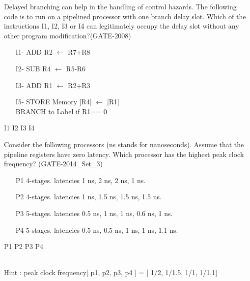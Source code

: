 \begin{questyle}
  \question  Delayed branching can help in the handling of control hazards. The following code is
             to run on a pipelined processor with one branch delay slot. Which of the instructions
             I1, I2, I3 or I4 can legitimately occupy the delay slot without any other program modification?(GATE-2008)

             \begin{enumerate}
                \item[I1-] ADD R2 \(\leftarrow\) R7+R8
                \item[I2-] SUB R4 \(\leftarrow\) R5-R6
                \item[I3-] ADD R1 \(\leftarrow\) R2+R3
                \item[I5-] STORE Memory [R4] \(\leftarrow\) [R1] \\
                 BRANCH to Label if R1== 0
            \end{enumerate}

  \begin{oneparchoices}
    \choice         I1
    \choice         I2
    \choice         I3
    \CorrectChoice  I4
  \end{oneparchoices}
\end{questyle}


\begin{questyle}
  \question  Consider the following processors (ns stands for nanoseconds). Assume that the pipeline registers
             have zero latency. Which processor has the highest peak clock frequency? (GATE-2014\_Set\_3)
    \begin{enumerate}
        \item[P1] 4-stages. latencies 1 ns, 2 ns, 2 ns, 1 ns.
        \item[P2] 4-stages. latencies 1 ns, 1.5 ns, 1.5 ns, 1.5 ns.
        \item[P3] 5-stages. latencies 0.5 ns, 1 ns, 1 ns, 0.6 ns, 1 ns.
        \item[P4] 5-stages. latencies 0.5 ns, 0.5 ns, 1 ns, 1 ns, 1.1 ns.
    \end{enumerate}
  \begin{oneparchoices}
    \choice         P1
    \choice         P2
    \CorrectChoice  P3
    \choice         P4
  \end{oneparchoices} \\
  Hint : peak clock frequency[ p1, p2, p3, p4 ] = [ 1/2, 1/1.5, 1/1, 1/1.1]
\end{questyle}


